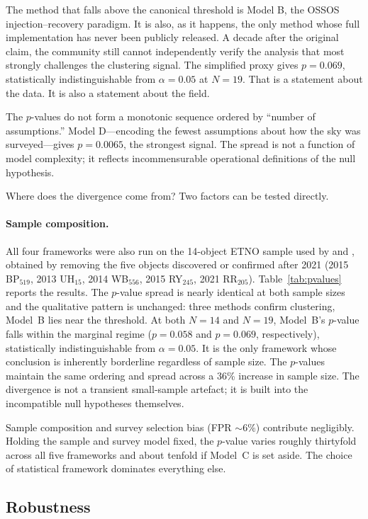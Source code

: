 \documentclass{aa}
\begin{document}
The method that falls above the canonical threshold is Model B, the OSSOS injection--recovery paradigm. It is also, as it happens, the only method whose full implementation has never been publicly released. A decade after the original claim, the community still cannot independently verify the analysis that most strongly challenges the clustering signal. The simplified proxy gives $p=0.069$, statistically indistinguishable from $\alpha=0.05$ at $N=19$. That is a statement about the data. It is also a statement about the field.

The $p$-values do not form a monotonic sequence ordered by ``number of assumptions.'' Model D---encoding the fewest assumptions about how the sky was surveyed---gives $p=0.0065$, the strongest signal. The spread is not a function of model complexity; it reflects incommensurable operational definitions of the null hypothesis.

Where does the divergence come from? Two factors can be tested directly.

\paragraph{Sample composition.}
All four frameworks were also run on the 14-object ETNO sample used by \citet{brown2019} and \citet{napier2021}, obtained by removing the five objects discovered or confirmed after 2021 (2015 BP$_{519}$, 2013 UH$_{15}$, 2014 WB$_{556}$, 2015 RY$_{245}$, 2021 RR$_{205}$). Table~\ref{tab:pvalues} reports the results. The $p$-value spread is nearly identical at both sample sizes and the qualitative pattern is unchanged: three methods confirm clustering, Model~B lies near the threshold. At both $N=14$ and $N=19$, Model~B's $p$-value falls within the marginal regime ($p=0.058$ and $p=0.069$, respectively), statistically indistinguishable from $\alpha=0.05$. It is the only framework whose conclusion is inherently borderline regardless of sample size. The $p$-values maintain the same ordering and spread across a 36\% increase in sample size. The divergence is not a transient small-sample artefact; it is built into the incompatible null hypotheses themselves.

Sample composition and survey selection bias (FPR $\sim6\%$) contribute negligibly. Holding the sample and survey model fixed, the $p$-value varies roughly thirtyfold across all five frameworks and about tenfold if Model~C is set aside. The choice of statistical framework dominates everything else.

\subsection{Robustness}
\end{document}
